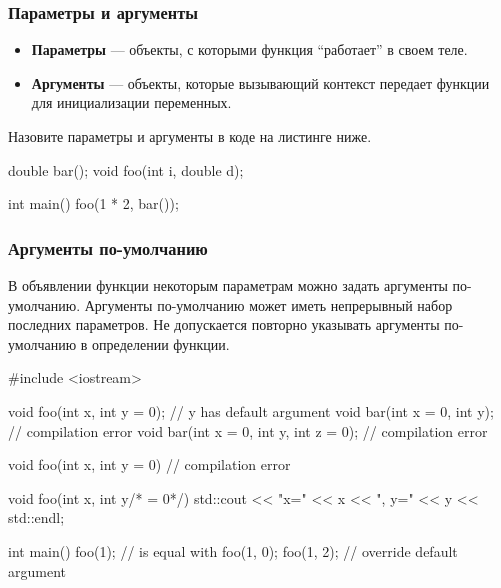\documentclass[compress, 8pt]{beamer}
\begin{document}
\begin{frame}[fragile]

    \frametitle{Параметры и аргументы}

    \begin{itemize}

        \item \textbf{Параметры} --- объекты, с которыми функция \enquote{работает} в своем теле.

        \item \textbf{Аргументы} --- объекты, которые вызывающий контекст передает функции
            для инициализации переменных.

    \end{itemize}

    \hfill\break
    \begin{task}
        Назовите параметры и аргументы в коде на листинге ниже.
    \end{task}

    \begin{myinplacelisting}[minted language=cpp]
double bar();
void foo(int i, double d);

int main() {
    foo(1 * 2, bar());
}
    \end{myinplacelisting}

\end{frame}

\begin{frame}[fragile]

    \frametitle{Аргументы по-умолчанию}

    \hfill\break
    В объявлении функции некоторым параметрам можно задать аргументы по-умолчанию.
    Аргументы по-умолчанию может иметь непрерывный набор последних параметров.
    Не допускается повторно указывать аргументы по-умолчанию в определении функции.

    \begin{myinplacelisting}[minted language=cpp]
#include <iostream>

void foo(int x, int y = 0); // y has default argument
void bar(int x = 0, int y); // compilation error
void bar(int x = 0, int y, int z = 0); // compilation error

void foo(int x, int y = 0) {} // compilation error

void foo(int x, int y/* = 0*/) {
    std::cout << "x=" << x << ", y=" << y << std::endl;
}

int main() {
    foo(1); // is equal with foo(1, 0);
    foo(1, 2); // override default argument
}
    \end{myinplacelisting}

\end{frame}
\end{document}

